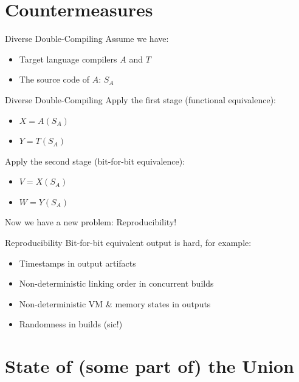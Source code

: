 \documentclass[12pt]{beamer}
\begin{document}
  \section{Countermeasures}

  \begin{frame}{Diverse Double-Compiling}
    Assume we have:

    \begin{itemize}
    \item Target language compilers $A$ and $T$
    \item The source code of $A$: $ S_{A} $
    \end{itemize}
  \end{frame}

  \begin{frame}{Diverse Double-Compiling}
    Apply the first stage (functional equivalence):

    \begin{itemize}
    \item $ X = A(S_{A})$
    \item $ Y = T(S_{A})$
    \end{itemize}

    Apply the second stage (bit-for-bit equivalence):

    \begin{itemize}
    \item $ V = X(S_{A})$
    \item $ W = Y(S_{A})$
    \end{itemize}

    Now we have a new problem: Reproducibility!
  \end{frame}

  \begin{frame}{Reproducibility}
    Bit-for-bit equivalent output is hard, for example:

    \begin{itemize}
    \item Timestamps in output artifacts
    \item Non-deterministic linking order in concurrent builds
    \item Non-deterministic VM & memory states in outputs
    \item Randomness in builds (sic!)
    \end{itemize}
  \end{frame}

  \section{State of (some part of) the Union}
\end{document}
